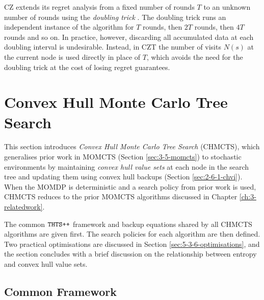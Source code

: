     CZ \cite{cz,cz_long} extends its regret analysis from a fixed number of rounds $T$ to an unknown number of rounds using the \textit{doubling trick} \cite{doubling_trick}. The doubling trick runs an independent instance of the algorithm for $T$ rounds, then $2T$ rounds, then $4T$ rounds and so on. In practice, however, discarding all accumulated data at each doubling interval is undesirable. Instead, in CZT the number of visits $N(s)$ at the current node is used directly in place of $T$, which avoids the need for the doubling trick at the cost of losing regret guarantees.
    












\section{Convex Hull Monte Carlo Tree Search}
\label{sec:5-3-chmcts}

    This section introduces \textit{Convex Hull Monte Carlo Tree Search} (CHMCTS), which generalises prior work in MOMCTS (Section \ref{sec:3-5-momcts}) to stochastic environments by maintaining \textit{convex hull value sets} at each node in the search tree and updating them using convex hull backups (Section \ref{sec:2-6-1-chvi}). When the MOMDP is deterministic and a search policy from prior work is used, CHMCTS reduces to the prior MOMCTS algorithms discussed in Chapter \ref{ch:3-relatedwork}.

    The common ${\textnormal{\texttt{THTS++}}}$ framework and backup equations shared by all CHMCTS algorithms are given first. The search policies for each algorithm are then defined. Two practical optimisations are discussed in Section \ref{sec:5-3-6-optimisations}, and the section concludes with a brief discussion on the relationship between entropy and convex hull value sets.

\subsection{Common Framework}
\label{sec:5-3-1-framework}

